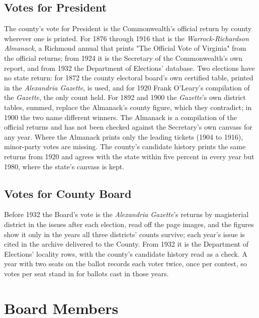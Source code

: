 \subsection{Votes for President}
The county's vote for President is the Commonwealth's official return by
county wherever one is printed. For 1876 through 1916 that is the
\textit{Warrock-Richardson Almanack}, a Richmond annual that prints "The
Official Vote of Virginia" from the official returns; from 1924 it is the
Secretary of the Commonwealth's own report, and from 1932 the Department of
Elections' database.\autocite{warrock1868,warrock1892,warrock1900,warrock1911,vasecretary1924,vasecretary1928,vaelections}
Two elections have no state return: for 1872 the county electoral board's own
certified table, printed in the \textit{Alexandria Gazette}, is used, and for
1920 Frank O'Leary's compilation of the \textit{Gazette}, the only count
held.\autocite{alexandriagazette1872official,oleary2010} For 1892 and 1900 the
\textit{Gazette}'s own district tables, summed, replace the Almanack's county
figure, which they contradict; in 1900 the two name different winners. The
Almanack is a compilation of the official returns and has not been checked
against the Secretary's own canvass for any year. Where the Almanack prints
only the leading tickets (1904 to 1916), minor-party votes are missing. The
county's candidate history prints the same returns from 1920 and agrees with
the state within five percent in every year but 1980, where the state's
canvass is kept.\autocite{arlingtonelections2021}

\subsection{Votes for County Board}
Before 1932 the Board's vote is the \textit{Alexandria Gazette}'s returns by
magisterial district in the issues after each election, read off the page
images, and the figures show it only in the years all three districts' counts
survive; each year's issue is cited in the archive delivered to the County.
From 1932 it is the Department of Elections'
locality rows, with the county's candidate history read as a check. A year with
two seats on the ballot records each voter twice, once per contest, so votes
per seat stand in for ballots cast in those years.

\section{Board Members}

